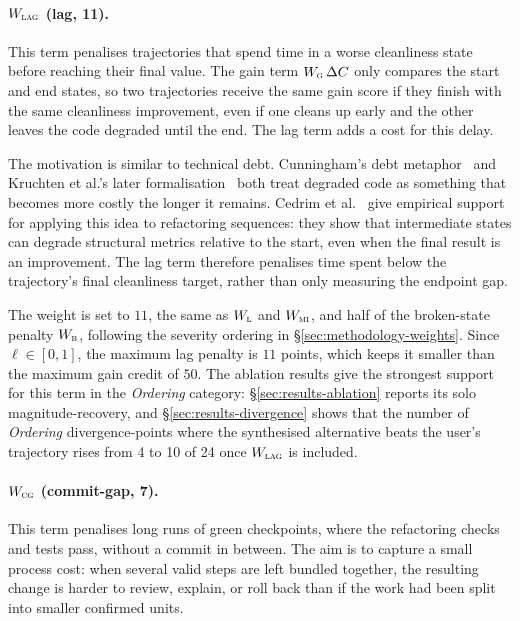 \paragraph{$W_{\textsc{lag}}$ (lag, 11).}
This term penalises trajectories that spend time in a worse cleanliness state before reaching their final value. The gain term $W_{\textsc{g}}\,\Delta C$ only compares the start and end states, so two trajectories receive the same gain score if they finish with the same cleanliness improvement, even if one cleans up early and the other leaves the code degraded until the end. The lag term adds a cost for this delay.

The motivation is similar to technical debt. Cunningham's debt metaphor~\cite{cunningham1992wycash} and Kruchten et al.'s later formalisation~\cite{kruchten2012technicaldebt} both treat degraded code as something that becomes more costly the longer it remains. Cedrim et al.~\cite{cedrim2017refactoring} give empirical support for applying this idea to refactoring sequences: they show that intermediate states can degrade structural metrics relative to the start, even when the final result is an improvement. The lag term therefore penalises time spent below the trajectory's final cleanliness target, rather than only measuring the endpoint gap.

The weight is set to $11$, the same as $W_{\textsc{l}}$ and $W_{\textsc{mi}}$, and half of the broken-state penalty $W_{\textsc{b}}$, following the severity ordering in \S\ref{sec:methodology-weights}. Since $\ell \in [0, 1]$, the maximum lag penalty is $11$ points, which keeps it smaller than the maximum gain credit of $50$. The ablation results give the strongest support for this term in the \emph{Ordering} category: \S\ref{sec:results-ablation} reports its solo magnitude-recovery, and \S\ref{sec:results-divergence} shows that the number of \emph{Ordering} divergence-points where the synthesised alternative beats the user's trajectory rises from 4 to 10 of 24 once $W_{\textsc{lag}}$ is included.

\paragraph{$W_{\textsc{cg}}$ (commit-gap, 7).}
This term penalises long runs of green checkpoints, where the refactoring checks and tests pass, without a commit in between. The aim is to capture a small process cost: when several valid steps are left bundled together, the resulting change is harder to review, explain, or roll back than if the work had been split into smaller confirmed units.

